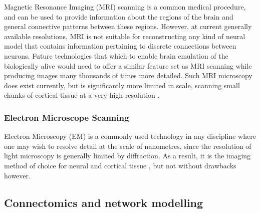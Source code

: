 Magnetic Resonance Imaging (MRI) scanning is a common medical procedure, and can
be used to provide information about the regions of the brain and general
connective patterns between these regions. However, at current generally
available resolutions, MRI is not suitable for reconstructing any kind of neural
model that contains information pertaining to discrete connections between
neurons. Future technologies that which to enable brain emulation of the
biologically alive would need to offer a similar feature set as MRI scanning
while producing images many thousands of times more detailed. Such MRI
microscopy does exist currently, but is significantly more limited in scale,
scanning small chunks of cortical tissue at a very high resolution
\autocite{johnson_three-dimensional_1987,bostrom_whole_2008}.

\subsubsection*{Electron Microscope Scanning}

Electron Microscopy (EM) is a commonly used technology in any discipline where
one may wish to resolve detail at the scale of nanometres, since the resolution
of light microscopy is generally limited by diffraction. As a result, it is
the imaging method of choice for neural and cortical tissue
\autocite{marc_retinal_2013, kaynig_large-scale_2015}, but not without drawbacks
however.


\subsection{Connectomics and network modelling}


